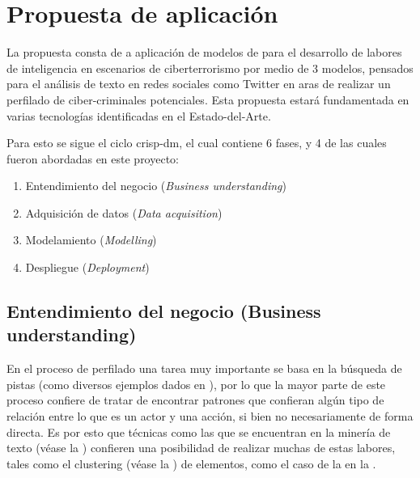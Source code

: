 
\chapter{Propuesta de aplicación} %

\label{chap:proposal} %


\newcommand{\nmodels}{{3 }}

La propuesta consta de a aplicación de modelos de  para el desarrollo de labores de inteligencia en escenarios de ciberterrorismo por medio de \nmodels modelos, pensados para el análisis de texto en redes sociales como Twitter en aras de realizar un perfilado de ciber-criminales potenciales. Esta propuesta estará fundamentada en varias tecnologías identificadas en el \mbox{Estado-del-Arte}.

Para esto se sigue el ciclo \gls{crisp-dm}, el cual contiene 6 fases, y 4 de las cuales fueron abordadas en este proyecto: 
\begin{enumerate}
\item Entendimiento del negocio (\textsl{Business understanding})
\item Adquisición de datos (\textsl{Data acquisition})
\item Modelamiento (\textsl{Modelling})
\item Despliegue (\textsl{Deployment})
\end{enumerate}

\section{Entendimiento del negocio (Business understanding)}
En el proceso de perfilado una tarea muy importante se basa en la búsqueda de pistas (como diversos ejemplos dados en \cite{mena2003investigative}), por lo que la mayor parte de este proceso confiere de tratar de encontrar patrones que confieran algún tipo de relación entre lo que es un actor y una acción, si bien no necesariamente de forma directa. Es por esto que técnicas como las que se encuentran en la minería de texto (véase la ) confieren una posibilidad de realizar muchas de estas labores, tales como el \gls{clustering} (véase la ) de elementos, como el caso de la  en la .

